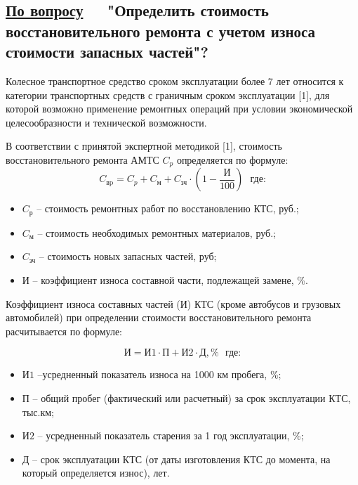\subsection{\underline{По  вопросу}\, \, \,	\textbf{\small{"Определить стоимость восстановительного ремонта с учетом износа стоимости запасных частей"?}}}
\renewcommand\baselinestretch{1.2}\small\normalsize
Колесное транспортное средство сроком эксплуатации более 7 лет относится к категории транспортных средств с граничным сроком эксплуатации [1], для которой возможно применение ремонтных операций при условии экономической целесообразности и  технической возможности.  
                                         
В соответствии с принятой экспертной методикой [1], стоимость восстановительного ремонта АМТС  $ C_p $ определяется по формуле:
%
\begin{equation}\label{eq:r}
C_\text{вp} =C_p + C_\text{м} + C_\text{зч}\cdot\left( 1-\frac{\text{И}}{100}\right)  \,\,\,\, \text{где:}
\end{equation}
%
%
\begin{itemize}
%	
\item[ ]$C_\text {р} $ --  стоимость ремонтных работ по восстановлению КТС, руб.;
\item[ ]$ C_\text{м} $ --  стоимость необходимых ремонтных материалов, руб.;
\item[ ]$ C_\text{зч} $ --  стоимость новых запасных частей, руб;
\item[ ] $ \text{И} $ -- коэффициент износа составной части, подлежащей замене, \%.
\end{itemize}
%
%
Коэффициент износа составных частей (И) КТС (кроме автобусов и грузовых автомобилей) при определении стоимости восстановительного ремонта расчитывается по формуле:

\begin{equation}\label{eqsnos}
\text{И} =\text{И1}\cdot\text{П}+\text{И2}\cdot \text{Д}, \%  \,\,\,\, \text{где:}
\end{equation}

\begin{itemize}
	\item [] $ \text{И1} $ --усредненный показатель износа на 1000 км пробега, \%; 
	\item [] $ \text{П} $ -- общий пробег (фактический или расчетный) за срок эксплуатации КТС, тыс.км;
	\item [] $ \text{И2} $ -- усредненный показатель старения за 1 год эксплуатации, \%;
	\item [] $ \text{Д} $ -- срок эксплуатации КТС (от даты изготовления КТС до момента, на который определяется износ), лет. 
\end{itemize}

